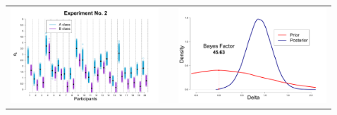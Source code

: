 \documentclass[final]{beamer}
\newlength{\sepwid}
\newlength{\onecolwid}
\newlength{\twocolwid}
\begin{document}
\begin{frame}[t]
\begin{columns}[t]
\begin{column}{\twocolwid}
\begin{columns}[t,totalwidth=\twocolwid]
\begin{column}{\onecolwid}
\begin{alertblock}{}
\begin{center}
\begin{tabular}{ccc}
\includegraphics[width=0.5\linewidth]{Figures/1-Exp2_1.pdf} & \hfill & \includegraphics[width=0.47\linewidth]{Figures/1-Exp2_2.pdf}
\end{tabular}
\end{center}


\end{alertblock}
\end{column} %

\setlength{\onecolwid}{0.21\paperwidth}
\begin{column}{\sepwid}\end{column} %
\begin{column}{\onecolwid}\vspace{-.6in} %


\begin{alertblock}{}


\end{alertblock}
\end{column}
\end{columns}
\end{column}
\end{columns}
\end{frame}
\end{document}
